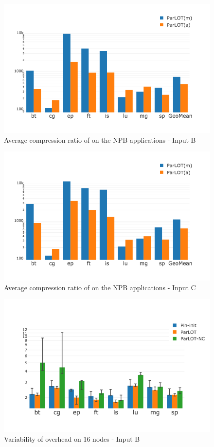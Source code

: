 %
\begin{figure}[b]
\centering
\includegraphics[width=.75\textwidth]{parlot/figs.comet.newMed/comet_chartAvg_cr_B_p3_5.png}
\caption{ Average compression ratio of \parlot on the NPB applications - Input B}
\label{comet_chartAvg_cr_B_p3_5}
\end{figure}

\begin{figure}[t]
\centering
\includegraphics[width=.75\textwidth]{parlot/figs.comet.newMed/comet_chartAvg_cr_C_p3_5.png}
\caption{ Average compression ratio of \parlot on the NPB applications - Input C}
\label{comet_chartAvg_cr_C_p3_5}
\end{figure}





\begin{figure}[]
\centering
\includegraphics[width=.75\textwidth]{parlot/figs.comet.newMed/comet_BX2_Main_16_B_p3_5.png}
\caption{ Variability of \parlotm overhead on 16 nodes - Input B}
\label{comet_BX2_Main_16_B_p3_5}
\end{figure}


